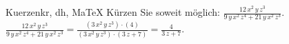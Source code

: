 \begin{MAufgabe}{Kuerzen}{kr, dh, MaTeX}
K\"urzen Sie soweit m\"oglich: $\frac{12\, x^2\, y\, z^3}{9\, y\, x^2\, z^4 + 21\, y\, x^2\, z^3}$.\\ 
\ifLsg\MLoesung
\quad $\frac{12\, x^2\, y\, z^3}{9\, y\, x^2\, z^4 + 21\, y\, x^2\, z^3}=\frac{(3\, x^2\, y\, z^3)\cdot(4)}{(3\, x^2\, y\, z^3)\cdot(3\, z + 7)}=\frac{4}{3\, z + 7}$.\else\relax\fi
 \end{MAufgabe}